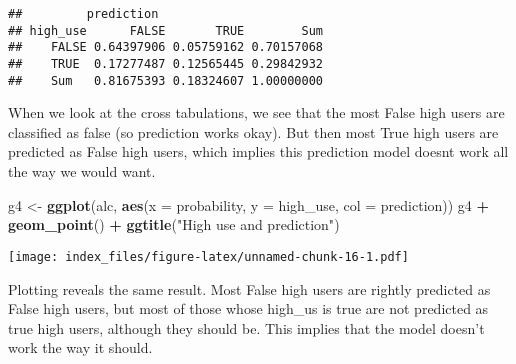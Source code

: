 \documentclass[]{article}
\newenvironment{Shaded}{\begin{snugshade}}{\end{snugshade}}
\newcommand{\KeywordTok}[1]{\textcolor[rgb]{0.13,0.29,0.53}{\textbf{#1}}}
\newcommand{\DataTypeTok}[1]{\textcolor[rgb]{0.13,0.29,0.53}{#1}}
\newcommand{\FloatTok}[1]{\textcolor[rgb]{0.00,0.00,0.81}{#1}}
\newcommand{\StringTok}[1]{\textcolor[rgb]{0.31,0.60,0.02}{#1}}
\newcommand{\ControlFlowTok}[1]{\textcolor[rgb]{0.13,0.29,0.53}{\textbf{#1}}}
\newcommand{\OperatorTok}[1]{\textcolor[rgb]{0.81,0.36,0.00}{\textbf{#1}}}
\newcommand{\NormalTok}[1]{#1}
\begin{document}
\begin{Shaded}
\end{Shaded}

\begin{verbatim}
##         prediction
## high_use      FALSE       TRUE        Sum
##    FALSE 0.64397906 0.05759162 0.70157068
##    TRUE  0.17277487 0.12565445 0.29842932
##    Sum   0.81675393 0.18324607 1.00000000
\end{verbatim}

When we look at the cross tabulations, we see that the most False high
users are classified as false (so prediction works okay). But then most
True high users are predicted as False high users, which implies this
prediction model doesnt work all the way we would want.

\begin{Shaded}
\begin{Highlighting}[]
\NormalTok{g4 <-}\StringTok{ }\KeywordTok{ggplot}\NormalTok{(alc, }\KeywordTok{aes}\NormalTok{(}\DataTypeTok{x =}\NormalTok{ probability, }\DataTypeTok{y =}\NormalTok{ high_use, }\DataTypeTok{col =}\NormalTok{ prediction))}
\NormalTok{g4 }\OperatorTok{+}\StringTok{ }\KeywordTok{geom_point}\NormalTok{() }\OperatorTok{+}\StringTok{ }\KeywordTok{ggtitle}\NormalTok{(}\StringTok{"High use and prediction"}\NormalTok{)}
\end{Highlighting}
\end{Shaded}

\texttt{[image: index\_files/figure-latex/unnamed-chunk-16-1.pdf]}

Plotting reveals the same result. Most False high users are rightly
predicted as False high users, but most of those whose high\_us is true
are not predicted as true high users, although they should be. This
implies that the model doesn't work the way it should.

\begin{Shaded}
\end{Shaded}
\end{document}
